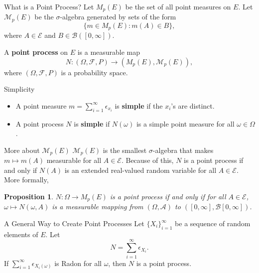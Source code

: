\documentclass{beamer}
\newtheorem{proposition}{Proposition}
\begin{document}
\begin{frame}{What is a Point Process?}
    Let $M_p(E)$ be the set of all point measures on $E$. Let $\mathcal{M}_p(E)$ be the $\sigma$-algebra generated by sets of the form
    \[
    \{m \in M_p(E) : m(A) \in B\},
    \]
    where $A \in \mathcal{E}$ and $B \in \mathcal{B}([0, \infty])$.

    \smallskip

    \begin{definition}
        A \textbf{point process} on $E$ is a measurable map
        \[
        N : (\Omega, \mathcal{F}, P) \to (M_p(E), \mathcal{M}_p(E)),
        \]
        where $(\Omega, \mathcal{F}, P)$ is a probability space.
    \end{definition}
\end{frame}

\begin{frame}{Simplicity}
    \begin{itemize}
        \item A point measure $m = \sum_{i = 1}^{\infty} \epsilon_{x_i}$ is \textbf{simple} if the $x_i$'s are distinct.
        \item A point process $N$ is \textbf{simple} if $N(\omega)$ is a simple point measure for all $\omega \in \Omega$.
    \end{itemize}
\end{frame}

\begin{frame}{More about $\mathcal{M}_p(E)$}
    $\mathcal{M}_p(E)$ is the smallest $\sigma$-algebra that makes $m \mapsto m(A)$ measurable for all $A \in \mathcal{E}$. Because of this, $N$ is a point process if and only if $N(A)$ is an extended real-valued random variable for all $A \in \mathcal{E}$. More formally,
    \begin{proposition}
    $N : \Omega \to M_p(E)$ is a point process if and only if for all $A \in \mathcal{E}$, $\omega \mapsto N(\omega, A)$ is a measurable mapping from $(\Omega, \mathcal{A})$ to $([0, \infty], \mathcal{B}[0, \infty])$.
    \end{proposition}
\end{frame}

\begin{frame}{A General Way to Create Point Processes}
    Let $\{X_i\}_{i = 1}^{\infty}$ be a sequence of random elements of $E$. Let
    \[
    N = \sum_{i = 1}^{\infty} \epsilon_{X_i}.
    \]
    If $\sum_{i = 1}^{\infty} \epsilon_{X_i(\omega)}$ is Radon for all $\omega$, then $N$ is a point process.
\end{frame}
\end{document}

